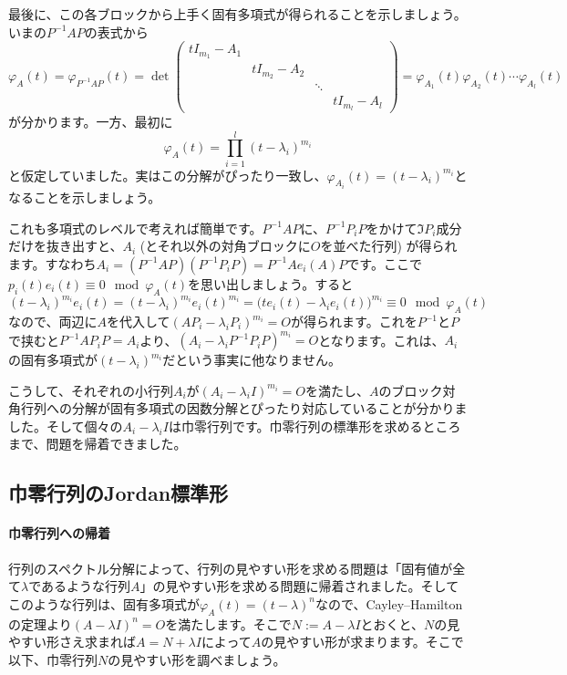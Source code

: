 最後に、この各ブロックから上手く固有多項式が得られることを示しましょう。いまの$P^{-1} A P$の表式から
\[
\varphi_{A}(t) = \varphi_{P^{-1} A P}(t) = \det
\begin{pmatrix}
tI_{m_1} - A_1 \\
& tI_{m_2} - A_2 \\
& & \ddots \\
& & & tI_{m_l} - A_l
\end{pmatrix}
= \varphi_{A_1}(t) \varphi_{A_2}(t) \cdots \varphi_{A_l}(t)
\]
が分かります。一方、最初に
\[
\varphi_A(t) = \prod_{i = 1}^l (t - \lambda_i)^{m_i}
\]
と仮定していました。実はこの分解がぴったり一致し、$\varphi_{A_i}(t) = (t - \lambda_i)^{m_i}$となることを示しましょう。

これも多項式のレベルで考えれば簡単です。$P^{-1} A P$に、$P^{-1} P_i P$をかけて$\Im P_i$成分だけを抜き出すと、$A_i$ (とそれ以外の対角ブロックに$O$を並べた行列) が得られます。すなわち$A_i = (P^{-1} A P)(P^{-1} P_i P) = P^{-1} A e_i(A) P$です。ここで$p_i(t) e_i(t) \equiv 0 \mod \varphi_A(t)$を思い出しましょう。すると
\[
(t - \lambda_i)^{m_i} e_i(t) = (t - \lambda_i)^{m_i} e_i(t)^{m_i} = \bigl(t e_i(t) - \lambda_i e_i(t)\bigr)^{m_i} \equiv 0 \mod \varphi_A(t)
\]
なので、両辺に$A$を代入して$(A P_i - \lambda_i P_i)^{m_i} = O$が得られます。これを$P^{-1}$と$P$で挟むと$P^{-1} A P_i P = A_i$より、$(A_i - \lambda_i P^{-1} P_i P)^{m_i} = O$となります。これは、$A_i$の固有多項式が$(t - \lambda_i)^{m_i}$だという事実に他なりません。

こうして、それぞれの小行列$A_i$が$(A_i - \lambda_i I)^{m_i} = O$を満たし、$A$のブロック対角行列への分解が固有多項式の因数分解とぴったり対応していることが分かりました。そして個々の$A_i - \lambda_i I$は巾零行列です。巾零行列の標準形を求めるところまで、問題を帰着できました。

\subsection{巾零行列のJordan標準形}

\paragraph{巾零行列への帰着}

行列のスペクトル分解によって、行列の見やすい形を求める問題は「固有値が全て$\lambda$であるような行列$A$」の見やすい形を求める問題に帰着されました。そしてこのような行列は、固有多項式が$\varphi_A(t) = (t - \lambda)^n$なので、Cayley--Hamiltonの定理より$(A - \lambda I)^n = O$を満たします。そこで$N := A - \lambda I$とおくと、$N$の見やすい形さえ求まれば$A = N + \lambda I$によって$A$の見やすい形が求まります。そこで以下、巾零行列$N$の見やすい形を調べましょう。

